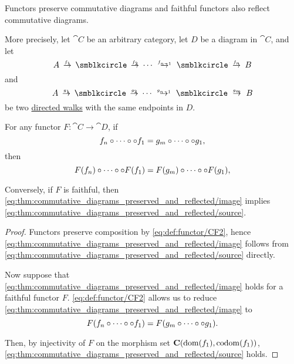 \begin{proposition}\label{thm:commutative_diagrams_preserved_and_reflected}
  Functors preserve commutative diagrams and faithful functors also reflect commutative diagrams.

  More precisely, let \( \cat{C} \) be an arbitrary category, let \( D \) be a diagram in \( \cat{C} \), and let
  \begin{equation*}
    A \reloset {f_1} \to \anon \reloset {f_2} \to \cdots \reloset {f_{n-1}} \to \anon \reloset {f_n} \to B
  \end{equation*}
  and
  \begin{equation*}
    A \reloset {g_1} \to \anon \reloset {g_2} \to \cdots \reloset {g_{n-1}} \to \anon \reloset {g_m} \to B
  \end{equation*}
  be two \hyperref[def:graph_walk/directed]{directed walks} with the same endpoints in \( D \).

  For any functor \( F: \cat{C} \to \cat{D} \), if
  \begin{equation}\label{eq:thm:commutative_diagrams_preserved_and_reflected/source}
    f_n \bincirc \cdots \bincirc \bincirc f_1 = g_m \bincirc \cdots \bincirc \bincirc g_1,
  \end{equation}
  then
  \begin{equation}\label{eq:thm:commutative_diagrams_preserved_and_reflected/image}
    F(f_n) \bincirc \cdots \bincirc \bincirc F(f_1) = F(g_m) \bincirc \cdots \bincirc \bincirc F(g_1),
  \end{equation}

  Conversely, if \( F \) is faithful, then \eqref{eq:thm:commutative_diagrams_preserved_and_reflected/image} implies \eqref{eq:thm:commutative_diagrams_preserved_and_reflected/source}.
\end{proposition}
\begin{proof}
  Functors preserve composition by \ref{eq:def:functor/CF2}, hence \eqref{eq:thm:commutative_diagrams_preserved_and_reflected/image} follows from \eqref{eq:thm:commutative_diagrams_preserved_and_reflected/source} directly.

  Now suppose that \eqref{eq:thm:commutative_diagrams_preserved_and_reflected/image} holds for a faithful functor \( F \). \ref{eq:def:functor/CF2} allows us to reduce \eqref{eq:thm:commutative_diagrams_preserved_and_reflected/image} to
  \begin{equation*}
    F(f_n \bincirc \cdots \bincirc \bincirc f_1) = F(g_m \bincirc \cdots \bincirc \bincirc g_1).
  \end{equation*}

  Then, by injectivity of \( F \) on the morphism set \( \cat{C}(\dom(f_1), \co\dom(f_1)) \), \eqref{eq:thm:commutative_diagrams_preserved_and_reflected/source} holds.
\end{proof}

